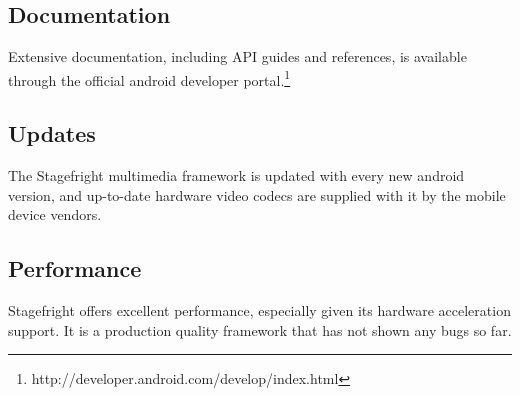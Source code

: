 \subsection{Documentation}
Extensive documentation, including API guides and references, is available through the official android developer portal.\footnote{http://developer.android.com/develop/index.html}
\subsection{Updates}
The Stagefright multimedia framework is updated with every new android version, and up-to-date hardware video codecs are supplied with it by the mobile device vendors.
\subsection{Performance}
Stagefright offers excellent performance, especially given its hardware acceleration support. It is a production quality framework that has not shown any bugs so far.


